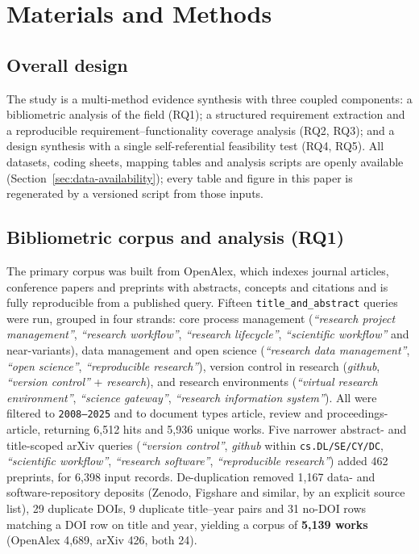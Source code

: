 \documentclass[pdflatex,sn-mathphys-num]{sn-jnl}%
\begin{document}
\section{Materials and Methods}\label{sec:methods}

\subsection{Overall design}\label{sec:design}

The study is a multi-method evidence synthesis with three coupled components: a bibliometric analysis of the field (RQ1); a structured requirement extraction and a reproducible requirement--functionality coverage analysis (RQ2, RQ3); and a design synthesis with a single self-referential feasibility test (RQ4, RQ5). All datasets, coding sheets, mapping tables and analysis scripts are openly available (Section~\ref{sec:data-availability}); every table and figure in this paper is regenerated by a versioned script from those inputs.

\subsection{Bibliometric corpus and analysis (RQ1)}\label{sec:m-biblio}

The primary corpus was built from OpenAlex, which indexes journal articles, conference papers and preprints with abstracts, concepts and citations and is fully reproducible from a published query. Fifteen \texttt{title\_and\_abstract} queries were run, grouped in four strands: core process management (\emph{``research project management''}, \emph{``research workflow''}, \emph{``research lifecycle''}, \emph{``scientific workflow''} and near-variants), data management and open science (\emph{``research data management''}, \emph{``open science''}, \emph{``reproducible research''}), version control in research (\emph{github}, \emph{``version control''} + \emph{research}), and research environments (\emph{``virtual research environment''}, \emph{``science gateway''}, \emph{``research information system''}). All were filtered to \texttt{2008--2025} and to document types article, review and proceedings-article, returning 6{,}512 hits and 5{,}936 unique works. Five narrower abstract- and title-scoped arXiv queries (\emph{``version control''}, \emph{github} within \texttt{cs.DL/SE/CY/DC}, \emph{``scientific workflow''}, \emph{``research software''}, \emph{``reproducible research''}) added 462 preprints, for 6{,}398 input records. De-duplication removed 1{,}167 data- and software-repository deposits (Zenodo, Figshare and similar, by an explicit source list), 29 duplicate DOIs, 9 duplicate title--year pairs and 31 no-DOI rows matching a DOI row on title and year, yielding a corpus of \textbf{5{,}139 works} (OpenAlex 4{,}689, arXiv 426, both 24).
\end{document}
